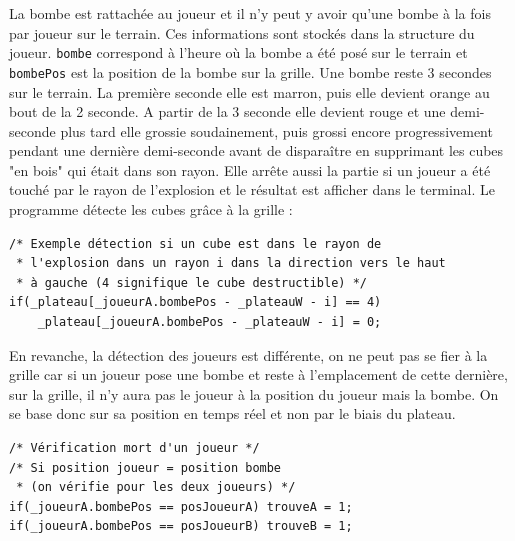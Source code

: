 \documentclass{article}
\begin{document}
    La bombe est rattachée au joueur et il n'y peut y avoir qu'une bombe à la fois par joueur sur le terrain. Ces informations sont stockés dans la structure du joueur. \texttt{bombe} correspond à l'heure où la bombe a été posé sur le terrain et \texttt{bombePos} est la position de la bombe sur la grille.
    Une bombe reste 3 secondes sur le terrain. La première seconde elle est marron, puis elle devient orange au bout de la 2 seconde. A partir de la 3 seconde elle devient rouge et une demi-seconde plus tard elle grossie soudainement, puis grossi encore progressivement pendant une dernière demi-seconde avant de disparaître en supprimant les cubes "en bois" qui était dans son rayon. Elle arrête aussi la partie si un joueur a été touché par le rayon de l'explosion et le résultat est afficher dans le terminal.
    Le programme détecte les cubes grâce à la grille :
    \begin{center}\begin{minipage}{0.9\textwidth}
        \begin{verbatim}
/* Exemple détection si un cube est dans le rayon de
 * l'explosion dans un rayon i dans la direction vers le haut
 * à gauche (4 signifique le cube destructible) */
if(_plateau[_joueurA.bombePos - _plateauW - i] == 4)
    _plateau[_joueurA.bombePos - _plateauW - i] = 0;
        \end{verbatim}
    \end{minipage}\end{center}

    En revanche, la détection des joueurs est différente, on ne peut pas se fier à la grille car si un joueur pose une bombe et reste à l'emplacement de cette dernière, sur la grille, il n'y aura pas le joueur à la position du joueur mais la bombe. On se base donc sur sa position en temps réel et non par le biais du plateau.
    \begin{center}\begin{minipage}{0.9\textwidth}
        \begin{verbatim}
/* Vérification mort d'un joueur */
/* Si position joueur = position bombe
 * (on vérifie pour les deux joueurs) */
if(_joueurA.bombePos == posJoueurA) trouveA = 1;
if(_joueurA.bombePos == posJoueurB) trouveB = 1;
        \end{verbatim}
    \end{minipage}\end{center}
    \vspace{10pt}
\end{document}
